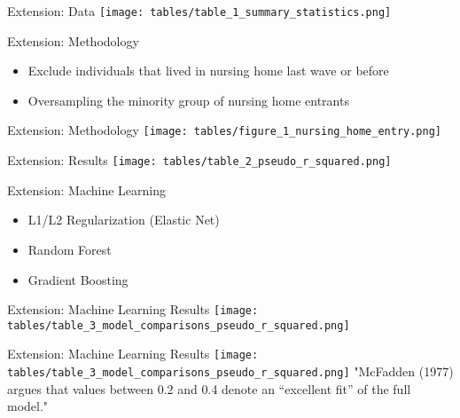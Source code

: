 \documentclass[10pt]{beamer}
\begin{document}
\begin{frame}{Extension: Data}
    \hspace*{-0.5cm}
    \texttt{[image: tables/table\_1\_summary\_statistics.png]}
\end{frame}

\begin{frame}{Extension: Methodology}
    \begin{itemize}
        \item Exclude individuals that lived in nursing home last wave or before \\
        \item Oversampling the minority group of nursing home entrants
    \end{itemize}
\end{frame}

\begin{frame}{Extension: Methodology}
    \hspace*{-0.85cm}
    \texttt{[image: tables/figure\_1\_nursing\_home\_entry.png]}
\end{frame}

\begin{frame}{Extension: Results}
    \hspace*{-0.5cm}
    \texttt{[image: tables/table\_2\_pseudo\_r\_squared.png]}
\end{frame}

\begin{frame}{Extension: Machine Learning}
    \begin{itemize}
        \item L1/L2 Regularization (Elastic Net)
        \item Random Forest
        \item Gradient Boosting
    \end{itemize}
\end{frame}

\begin{frame}{Extension: Machine Learning Results}
    \hspace*{-0.5cm}
    \texttt{[image: tables/table\_3\_model\_comparisons\_pseudo\_r\_squared.png]}
\end{frame}

\begin{frame}{Extension: Machine Learning Results}
    \hspace*{-0.5cm}
    \texttt{[image: tables/table\_3\_model\_comparisons\_pseudo\_r\_squared.png]}
    \newline
    \newline
    "McFadden (1977) argues that values between 0.2 and 0.4 denote an “excellent fit” of the full model."
\end{frame}
\end{document}
